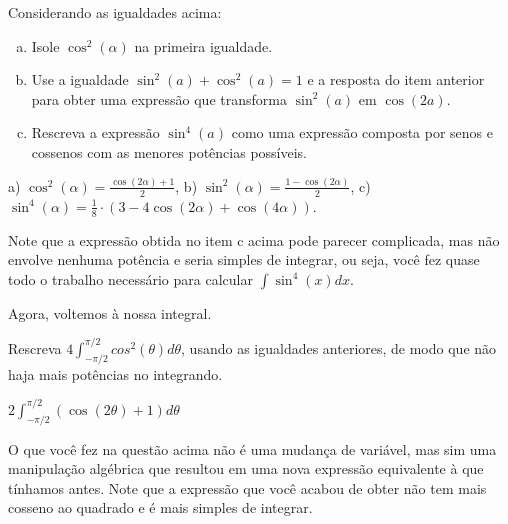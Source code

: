 \documentclass[main_estudante.tex]{subfiles}
\begin{document}
\begin{questao}
Considerando as igualdades acima:
\begin{enumerate}[a)]
\item Isole $\cos^2(\alpha)$ na primeira igualdade.
\item Use a igualdade $\sin^2(a) + \cos^2(a)=1$ e a resposta do item anterior para obter uma expressão que transforma $\sin^2(a)$ em $\cos(2a)$.
\item Rescreva a expressão $\sin^4(a)$ como uma expressão composta por senos e cossenos com as menores potências possíveis.
\end{enumerate}
\end{questao}

\begin{gabarito}
	\begin{gabaritoQuestao}
		a) $\cos^2(\alpha)=\frac{\cos(2\alpha)+1}{2}$, b) $\sin^2(\alpha)=\frac{1-\cos(2\alpha)}{2}$, c) $\sin^4(\alpha)=\frac{1}{8} \cdot (3-4\cos(2\alpha)+\cos(4\alpha))$.
	\end{gabaritoQuestao}
\end{gabarito}

Note que a expressão obtida no item c acima pode parecer complicada, mas não envolve nenhuma potência e seria simples de integrar, ou seja, você fez quase todo o trabalho necessário para calcular $\int \sin^4(x)dx$.

Agora, voltemos à nossa integral.

\begin{questao}
Rescreva $4\int_{-\pi/2}^{\pi/2} cos^2(\theta)d\theta$, usando as igualdades anteriores, de modo que não haja mais potências no integrando.
\end{questao}

\begin{gabarito}
	\begin{gabaritoQuestao}
		$2\int_{-\pi/2}^{\pi/2} (\cos(2\theta)+1)d\theta$
	\end{gabaritoQuestao}
\end{gabarito}

O que você fez na questão acima não é uma mudança de variável, mas sim uma manipulação algébrica que resultou em uma nova expressão equivalente à que tínhamos antes. Note que a expressão que você acabou de obter não tem mais cosseno ao quadrado e é mais simples de integrar.

\end{document}
